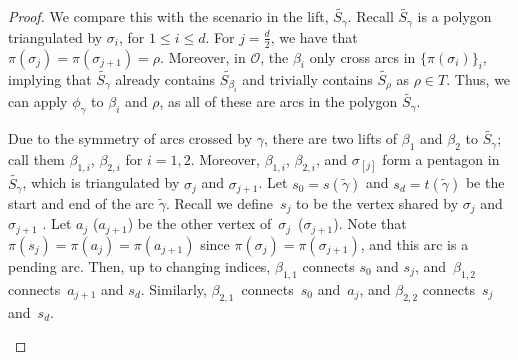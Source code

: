 \documentclass[11pt]{article}
\numberwithin{equation}{section}
\begin{document}
\begin{proof}
We compare this with the scenario in the lift, $\widetilde{S_\gamma}$. Recall $\widetilde{S_\gamma}$ is a polygon triangulated by $\sigma_i$, for $1 \leq i \leq d$. For $j = \frac{d}{2}$, we have that $\pi(\sigma_j) = \pi(\sigma_{j+1}) = \rho$. Moreover, in $\mathcal{O}$, the $\beta_i$ only cross arcs in $\{\pi(\sigma_i)\}_i$, implying that $\widetilde{S_\gamma}$ already contains $\widetilde{S_{\beta_i}}$ and trivially contains $\widetilde{S_\rho}$ as $\rho \in T$. Thus, we can apply $\phi_\gamma$ to $\beta_i$ and $\rho$, as all of these are arcs in the polygon $\widetilde{S_\gamma}$.

 Due to the symmetry of arcs crossed by $\gamma$, there are two lifts of $\beta_1$ and $\beta_2$ to $\widetilde{S_\gamma}$; call them $\beta_{1,i}$, $\beta_{2,i}$ for $i = 1,2$. Moreover, $\beta_{1,i}$, $\beta_{2,i}$, and $\sigma_{[j]}$ form a pentagon in $\widetilde{S_\gamma}$, which is triangulated by $\sigma_j$ and $\sigma_{j+1}$. Let $s_0 = s(\widetilde{\gamma})$ and $s_d = t(\widetilde{\gamma})$ be the start and end of the arc $\widetilde{\gamma}$. Recall we define~$s_j$ to be the vertex shared by $\sigma_j$ and $\sigma_{j+1}$ . Let $a_j$ ($a_{j+1}$) be the other vertex of~$\sigma_j$~($\sigma_{j+1}$). Note that $\pi(s_j) = \pi(a_j) = \pi(a_{j+1})$ since $\pi(\sigma_j) = \pi(\sigma_{j+1})$, and this arc is a pending arc. Then, up to changing indices, $\beta_{1,1}$ connects $s_0$ and $s_j$, and~$\beta_{1,2}$ connects~$a_{j+1}$ and $s_d$. Similarly, $\beta_{2,1}$~connects~$s_0$ and~$a_j$, and $\beta_{2,2}$ connects~$s_j$ and~$s_d$.

\begin{center}
\end{center}


\end{proof}
\end{document}

